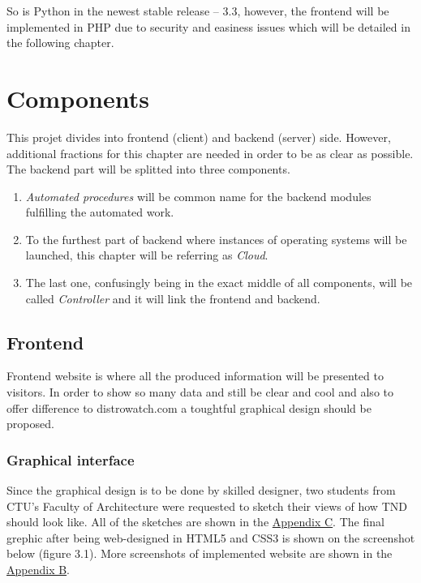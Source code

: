 \documentclass[thesis=B,english]{FITthesis}[2013/04/26]
\begin{document}
So  is Python in the newest stable release -- 3.3, however, the frontend will be implemented in PHP due to security and easiness issues which will be detailed in the following chapter.

\section{Components}

This projet divides into frontend (client) and backend (server) side. However, additional fractions for this chapter are needed in order to be as clear as possible. The backend part will be splitted into three components.

\begin{enumerate}
	\item \emph{Automated procedures} will be common name for the backend modules fulfilling the automated work.
	\item To the furthest part of backend where instances of operating systems will be launched, this chapter will be referring as \emph{Cloud}.
	\item The last one, confusingly being in the exact middle of all components, will be called \emph{Controller} and it will link the frontend and backend.
\end{enumerate}

\subsection{Frontend}

Frontend website is where all the produced information will be presented to visitors. In order to show so many data and still be clear and cool and also to offer difference to distrowatch.com a toughtful graphical design should be proposed.

\subsubsection{Graphical interface}

Since the graphical design is to be done by skilled designer, two students from CTU's Faculty of Architecture were requested to sketch their views of how TND should look like. All of the sketches are shown in the \hyperref[TODO]{Appendix C}. The final grephic after being web-designed in HTML5 and CSS3 is shown on the screenshot below (figure 3.1). More screenshots of implemented website are shown in the \hyperref[TODO]{Appendix B}.
\end{document}
